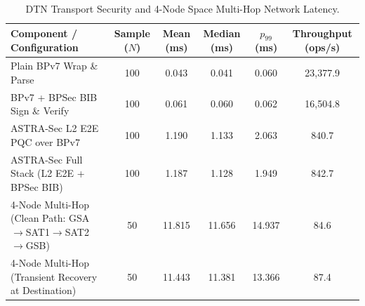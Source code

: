\begin{table}[t]
\centering
\caption{DTN Transport Security and 4-Node Space Multi-Hop Network Latency.}
\label{tab:dtn_and_multihop}
\small
\begin{tabular}{lccccc}
\hline
\textbf{Component / Configuration} & \textbf{Sample ($N$)} & \textbf{Mean (ms)} & \textbf{Median (ms)} & \textbf{$p_{99}$ (ms)} & \textbf{Throughput (ops/s)} \\
\hline
Plain BPv7 Wrap \& Parse & 100 & 0.043 & 0.041 & 0.060 & 23,377.9 \\
BPv7 + BPSec BIB Sign \& Verify & 100 & 0.061 & 0.060 & 0.062 & 16,504.8 \\
ASTRA-Sec L2 E2E PQC over BPv7 & 100 & 1.190 & 1.133 & 2.063 & 840.7 \\
ASTRA-Sec Full Stack (L2 E2E + BPSec BIB) & 100 & 1.187 & 1.128 & 1.949 & 842.7 \\
\hline
4-Node Multi-Hop (Clean Path: GSA$\to$SAT1$\to$SAT2$\to$GSB) & 50 & 11.815 & 11.656 & 14.937 & 84.6 \\
4-Node Multi-Hop (Transient Recovery at Destination) & 50 & 11.443 & 11.381 & 13.366 & 87.4 \\
\hline
\end{tabular}
\end{table}
